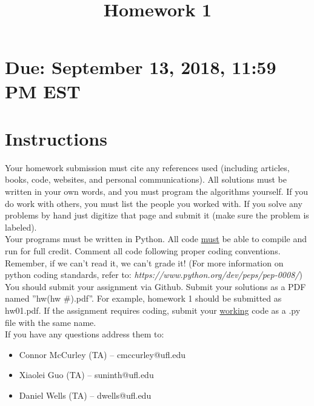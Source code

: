 \documentclass[11pt]{article}
\title{Homework 1}                                   %
\begin{document}
\maketitle

\section*{\textbf{Due: September 13, 2018, 11:59 PM EST}}

\section*{\textbf{Instructions}}

Your homework submission must cite any references used (including articles, books, code, websites, and personal communications). All solutions must be written in your own words, and you must program the algorithms yourself. If you do work with others, you must list the people you worked with. If you solve any problems by hand just digitize that page and submit it (make sure the problem is labeled). \\

\noindent Your programs must be written in Python.  All code \underline{must} be able to compile and run for full credit.  Comment all code following proper coding conventions. Remember, if we can't read it, we can't grade it! (For more information on python coding standards, refer to: \emph{https://www.python.org/dev/peps/pep-0008/}) \\

\noindent You should submit your assignment via Github.  Submit your solutions as a PDF named ''hw(hw \#).pdf''.  For example, homework 1 should be submitted as hw01.pdf.  If the assignment requires coding, submit your \underline{working} code as a .py file with the same name. \\



If you have any questions address them to:
\begin{itemize}
\item Connor McCurley (TA) -- cmccurley@ufl.edu
\item Xiaolei Guo (TA) -- suninth@ufl.edu
\item Daniel Wells (TA) -- dwells@ufl.edu
\end{itemize}

\pagebreak
\end{document}
